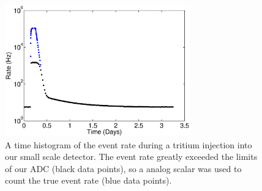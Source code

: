 \begin{figure}[h!]\centering
\includegraphics[width=80mm]{TimeHisto_Analog2.eps}
\caption{A time histogram of the event rate during a tritium injection into our small scale detector. The event rate greatly exceeded the limits of our ADC (black data points), so a analog scalar was used to count the true event rate (blue data points). }
\label{fig:Density}
\end{figure}

